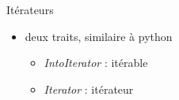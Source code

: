 \begin{frame}[fragile]{Itérateurs}
\protect\hypertarget{ituxe9rateurs}{}
\begin{Shaded}
\begin{Highlighting}[]
  \OperatorTok{\{}
    \OperatorTok{;}
    \OperatorTok{\&} \NormalTok{) }\OperatorTok{{-}\textgreater{}} \OperatorTok{\textless{}}\PreprocessorTok{::}\OperatorTok{\textgreater{};}
\OperatorTok{\}}
\end{Highlighting}
\end{Shaded}

\begin{itemize}
\tightlist
\item
  deux traits, similaire à python

  \begin{itemize}
  \tightlist
  \item
    \emph{IntoIterator} : itérable
  \item
    \emph{Iterator} : itérateur
  \end{itemize}
\end{itemize}
\end{frame}
